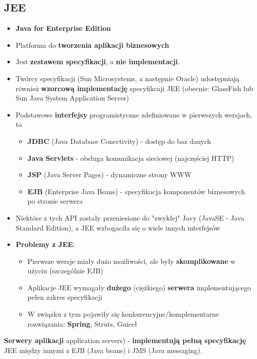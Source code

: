 \documentclass[../main.tex]{subfiles}
\begin{document}
    \subsection{JEE}
    \begin{itemize}
        \item \textbf{Java for Enterprise Edition}
        \item Platforma do \textbf{tworzenia aplikacji biznesowych}
        \item Jest \textbf{zestawem specyfikacji}, a \textbf{nie implementacji}.
        \item Twórcy specyfikacji (Sun Microsystems, a następnie Oracle) udostępniają również \textbf{wzorcową implementację} specyfikcaji JEE (obecnie: GlassFish lub Sun Java System Application Server)
        \item Podstawowe \textbf{interfejsy} programistyczne zdefiniowane w pierwszych wersjach, to
        \begin{itemize}
            \item \textbf{JDBC} (Java Database Conectivity) - dostęp do baz danych
            \item \textbf{Java Servlets} - obsługa komunikacja sieciowej (najczęściej HTTP)
            \item \textbf{JSP} (Java Server Pages) - dynamiczne strony WWW
            \item \textbf{EJB} (Enterprise Java Beans) - specyfikacja komponentów biznesowych po stronie serwera
        \end{itemize}
        \item Niektóre z tych API zostały przeniesione do "zwykłej" Javy (JavaSE - Java Standard Edition), a JEE wzbogaciła się o wiele innych interfejsów
        \item \textbf{Problemy z JEE}:
        \begin{itemize}
            \item Pierwsze wersje miały dużo możliwości, ale były \textbf{skomplikowane} w użyciu (szczególnie EJB)
            \item Aplikacje JEE wymagały \textbf{dużego} (ciężkiego) \textbf{serwera} implementującego pełen zakres specyfikacji
            \item W związku z tym pojawiły się konkurencyjne/komplementarne rozwiązania: \textbf{Spring}, Struts, Guiceł
        \end{itemize}
    \end{itemize}

    \textbf{Serwery aplikacji} application servers) - \textbf{implementują pełną specyfikację} JEE między innymi z EJB (Java beans) i
    JMS (Java messaging).
\end{document}
